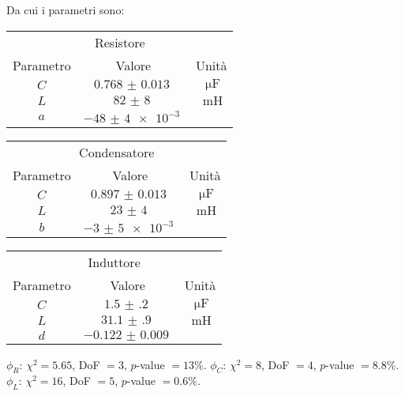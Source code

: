 \documentclass[a4paper]{article}
\begin{document}
Da cui i parametri sono:
\begin{center}
\begin{tabular}[t]{c|c|c}
        \multicolumn{3}{c}{Resistore} \\
	Parametro & Valore & Unità \\\midrule
	$C$ & $\SI{0.768(13)}{}$ & $\SI{}{\micro\F}$\\
	$L$ & $\SI{82(8)}{}$ & $\SI{}{\milli\henry}$\\
	$a$ & $\SI{-48(4)e-3}{}$ & \\
\end{tabular}\quad
\begin{tabular}[t]{c|c|c}
        \multicolumn{3}{c}{Condensatore} \\
	Parametro & Valore & Unità \\\midrule
	$C$ & $\SI{0.897(13)}{}$ & $\SI{}{\micro\F}$\\
	$L$ & $\SI{23(4)}{}$ & $\SI{}{\milli\henry}$\\
	$b$ & $\SI{-3(5)e-3}{}$ & \\
\end{tabular}\quad
\begin{tabular}[t]{c|c|c}
        \multicolumn{3}{c}{Induttore} \\
	Parametro & Valore & Unità \\\midrule
	$C$ & $\SI{1.5(2)}{}$ & $\SI{}{\micro\F}$\\
	$L$ & $\SI{31.1(9)}{}$ & $\SI{}{\milli\henry}$\\
	$d$ & $\SI{-0.122(9)}{}$ & \\
\end{tabular}
\end{center}
$\phi_R$: $\chi^2=5.65$, DoF $=3$, $p$-value $=13\%$. $\phi_C$: $\chi^2=8$, DoF $=4$, $p$-value $=8.8\%$. $\phi_L$: $\chi^2=16$, DoF $=5$, $p$-value $=0.6\%$.\\
\end{document}
